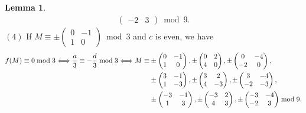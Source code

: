 \documentclass[12pt]{article}
\theoremstyle{definition}
\newtheorem{lemma}[theorem]{Lemma}
\numberwithin{equation}{section}
\numberwithin{theorem}{section}
\begin{document}
\begin{lemma}
{\begin{align*}
\begin{pmatrix}
-2 & 3
\end{pmatrix} 
\bmod{9}.  %
\end{align*}
$\mathrm{(4)}$ If 
$
M
\equiv
\pm
\begin{pmatrix}
0 & -1 \\
1 & 0
\end{pmatrix}
\bmod{3}
$ 
and $c$ is even, 
we have 
\begin{align*}
f(M)\equiv 0 \bmod{3} 
\Longleftrightarrow
\frac{a}{3} \equiv -\frac{d}{3} \bmod{3}
\Longleftrightarrow
M
\equiv& 
\pm
\begin{pmatrix}
0 & -1 \\
1 & 0
\end{pmatrix}, 
\pm
\begin{pmatrix}
0 & 2 \\
4 & 0
\end{pmatrix}, 
\pm
\begin{pmatrix}
0 & -4 \\
-2 & 0
\end{pmatrix},  \notag \\
&
\pm
\begin{pmatrix}
3 & -1 \\
1 & -3
\end{pmatrix},  
\pm
\begin{pmatrix}
3 & 2 \\
4 & -3
\end{pmatrix}, 
\pm
\begin{pmatrix}
3 & -4 \\
-2 & -3
\end{pmatrix}, \notag \\
&
\pm
\begin{pmatrix}
-3 & -1 \\
1 & 3
\end{pmatrix}, 
\pm
\begin{pmatrix}
-3 & 2 \\
4 & 3
\end{pmatrix},  
\pm
\begin{pmatrix}
-3 & -4 \\
-2 & 3
\end{pmatrix} 
\bmod{9}.   %
\end{align*}
}
\end{lemma}
\end{document}
